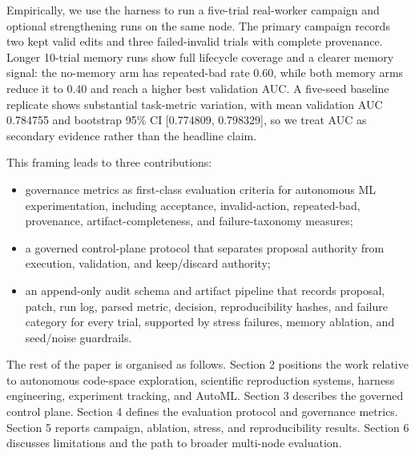 Empirically, we use the harness to run a five-trial real-worker campaign and optional strengthening runs on the same node. The primary campaign records two kept valid edits and three failed-invalid trials with complete provenance. Longer 10-trial memory runs show full lifecycle coverage and a clearer memory signal: the no-memory arm has repeated-bad rate 0.60, while both memory arms reduce it to 0.40 and reach a higher best validation AUC. A five-seed baseline replicate shows substantial task-metric variation, with mean validation AUC 0.784755 and bootstrap 95\% CI {[}0.774809, 0.798329{]}, so we treat AUC as secondary evidence rather than the headline claim.

This framing leads to three contributions:

\begin{itemize}
\tightlist
\item
  governance metrics as first-class evaluation criteria for autonomous ML experimentation, including acceptance, invalid-action, repeated-bad, provenance, artifact-completeness, and failure-taxonomy measures;
\item
  a governed control-plane protocol that separates proposal authority from execution, validation, and keep/discard authority;
\item
  an append-only audit schema and artifact pipeline that records proposal, patch, run log, parsed metric, decision, reproducibility hashes, and failure category for every trial, supported by stress failures, memory ablation, and seed/noise guardrails.
\end{itemize}

The rest of the paper is organised as follows. Section 2 positions the work relative to autonomous code-space exploration, scientific reproduction systems, harness engineering, experiment tracking, and AutoML. Section 3 describes the governed control plane. Section 4 defines the evaluation protocol and governance metrics. Section 5 reports campaign, ablation, stress, and reproducibility results. Section 6 discusses limitations and the path to broader multi-node evaluation.
